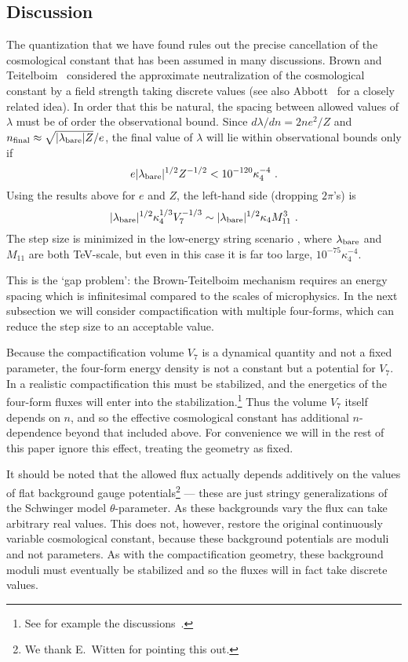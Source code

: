 \documentclass[12pt]{article}
\begin{document}
\subsection{Discussion}

The quantization that we have found rules out the precise cancellation
of the cosmological constant that has been assumed in many
discussions.  Brown and Teitelboim~\cite{BroTei87,BroTei88} considered
the approximate neutralization of the cosmological constant by a field
strength taking discrete values (see also Abbott~\cite{Abb85} for a
closely related idea).  In order that this be natural, the spacing
between allowed values of $\lambda$ must be of order the observational
bound.  Since $d\lambda/dn = 2n e^2/Z$ and $n_{\rm final} \approx
\sqrt{|\lambda_{\rm bare}|Z}/e$, the final value of $\lambda$ will lie
within observational bounds only if
\begin{equation}
e |\lambda_{\rm bare}|^{1/2} Z^{-1/2} < 10^{-120} \kappa_4^{-4}\ .
\end{equation}
Using the results above for $e$ and $Z$, the left-hand side (dropping
$2\pi$'s) is
\begin{equation}
|\lambda_{\rm bare}|^{1/2} \kappa_4^{1/3} V_7^{-1/3}
\sim |\lambda_{\rm bare}|^{1/2} \kappa_4 M_{11}^3
  \ .
\end{equation}
The step size is minimized in the low-energy string scenario
\cite{ArkDim98}, where $\lambda_{\rm bare}$ and $M_{11}$ are both
TeV-scale, but even in this case it is far too large, $10^{-75}
\kappa_4^{-4}$.

This is the `gap problem': the Brown-Teitelboim mechanism requires an
energy spacing which is infinitesimal compared to the scales of
microphysics.  In the next subsection we will consider
compactification with multiple four-forms, which can reduce the step
size to an acceptable value.

Because the compactification volume $V_7$ is a dynamical quantity and
not a fixed parameter, the four-form energy density is not a constant
but a potential for $V_7$.  In a realistic compactification this must
be stabilized, and the energetics of the four-form fluxes will enter
into the stabilization.\footnote {See for example the
discussions~\cite{Sun98,ArkDim98b}.}  Thus the volume $V_7$ itself
depends on $n$, and so the effective cosmological constant has
additional $n$-dependence beyond that included above.  For convenience
we will in the rest of this paper ignore this effect, treating the
geometry as fixed.

It should be noted that the allowed flux actually depends additively
on the values of flat background gauge potentials\footnote{We thank
E.~Witten for pointing this out.} --- these are just stringy
generalizations of the Schwinger model $\theta$-parameter.  As these
backgrounds vary the flux can take arbitrary real values.  This does
not, however, restore the original continuously variable cosmological
constant, because these background potentials are moduli and not
parameters.  As with the compactification geometry, these background
moduli must eventually be stabilized and so the fluxes will in fact
take discrete values.
\end{document}
